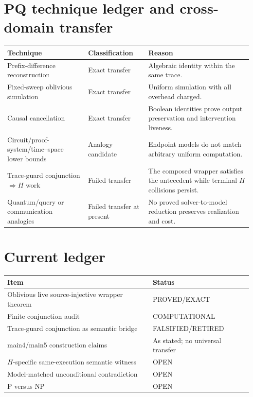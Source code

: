 \documentclass[11pt]{article}
\newcommand{\OPEN}{\textsf{OPEN}}
\newcommand{\EXACT}{\textsf{PROVED/EXACT}}
\newcommand{\COMP}{\textsf{COMPUTATIONAL}}
\newcommand{\RET}{\textsf{FALSIFIED/RETIRED}}
\begin{document}
\section*{PQ technique ledger and cross-domain transfer}
\begin{center}
\begin{tabularx}{\textwidth}{p{}p{}X}
\toprule
Technique & Classification & Reason\\
\midrule
Prefix-difference reconstruction & Exact transfer & Algebraic identity within
the same trace.\\
Fixed-sweep oblivious simulation & Exact transfer & Uniform simulation with
all overhead charged.\\
Causal cancellation & Exact transfer & Boolean identities prove output
preservation and intervention liveness.\\
Circuit/proof-system/time--space lower bounds & Analogy candidate & Endpoint
models do not match arbitrary uniform computation.\\
Trace-guard conjunction $\Rightarrow H$ work & Failed transfer & The composed
wrapper satisfies the antecedent while terminal $H$ collisions persist.\\
Quantum/query or communication analogies & Failed transfer at present & No
proved solver-to-model reduction preserves realization and cost.\\
\bottomrule
\end{tabularx}
\end{center}

\section*{Current ledger}
\begin{center}
\begin{tabular}{p{}p{}}
\toprule
Item & Status\\
\midrule
Oblivious live source-injective wrapper theorem & \EXACT{}\\
Finite conjunction audit & \COMP{}\\
Trace-guard conjunction as semantic bridge & \RET{}\\
main4/main5 construction claims & As stated; no universal transfer\\
$H$-specific same-execution semantic witness & \OPEN{}\\
Model-matched unconditional contradiction & \OPEN{}\\
P versus NP & \OPEN{}\\
\bottomrule
\end{tabular}
\end{center}
\end{document}
